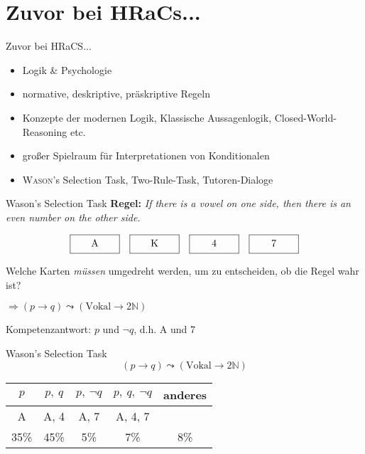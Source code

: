 
{
    \section{Zuvor bei HRaCs...}
}

\begin{frame}{Zuvor bei HRaCS...}
    \begin{itemize}
        \item Logik \& Psychologie
        \item normative, deskriptive, präskriptive Regeln
        \pause
        
        \item Konzepte der modernen Logik, Klassische Aussagenlogik, Closed-World-Reasoning etc.
        \item großer Spielraum für Interpretationen von Konditionalen
        \pause

        \item \textsc{Wason}'s Selection Task, Two-Rule-Task, Tutoren-Dialoge
    \end{itemize}
\end{frame}


\begin{frame}{Wason's Selection Task {\scriptsize \cite[S.~44-46]{stenningHumanReasoningCognitive2008}}}
    \textbf{Regel:} \emph{If there is a vowel on one side, then there is an even number on the other side.}

    \[
        \framebox[5em][c]{A\strut}\quad
        \framebox[5em][c]{K\strut}\quad
        \framebox[5em][c]{4\strut}\quad
        \framebox[5em][c]{7\strut}
    \]

    Welche Karten \emph{müssen} umgedreht werden, um zu entscheiden, ob die Regel wahr ist?

    $\Rightarrow (p \to q) \leadsto (\text{Vokal} \to 2\mathbb{N})$

    Kompetenzantwort: $p$ und $\lnot q$, d.h. A und 7
\end{frame}

\begin{frame}{Wason's Selection Task {\scriptsize \cite[S.~44-46]{stenningHumanReasoningCognitive2008}}}
    $$(p \to q) \leadsto (\text{Vokal} \to 2\mathbb{N})$$

    \begin{center}
        \begin{tabular}{c | c | c | c | c}
            $p$ &$p,~q$ &\alert{$p, ~\lnot q$} &$p, ~q, ~\lnot q$ &anderes \\
            \hline
            A &A, 4 &\alert{A, 7} &A, 4, 7 & \\
            \hline \hline
            35\% &45\% &\alert{5\%} &7\% &8\%
        \end{tabular}
    \end{center}
\end{frame}


